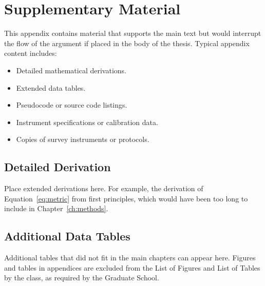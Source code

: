 
\chapter{Supplementary Material}
\label{app:supplementary}

This appendix contains material that supports the main text but would
interrupt the flow of the argument if placed in the body of the thesis.
Typical appendix content includes:

\begin{itemize}
  \item Detailed mathematical derivations.
  \item Extended data tables.
  \item Pseudocode or source code listings.
  \item Instrument specifications or calibration data.
  \item Copies of survey instruments or protocols.
\end{itemize}

\section{Detailed Derivation}
\label{app:derivation}

Place extended derivations here.
For example, the derivation of Equation~\eqref{eq:metric} from first
principles, which would have been too long to include in
Chapter~\ref{ch:methods}.

\section{Additional Data Tables}
\label{app:tables}

Additional tables that did not fit in the main chapters can appear here.
Figures and tables in appendices are excluded from the List of Figures
and List of Tables by the class, as required by the Graduate School.
